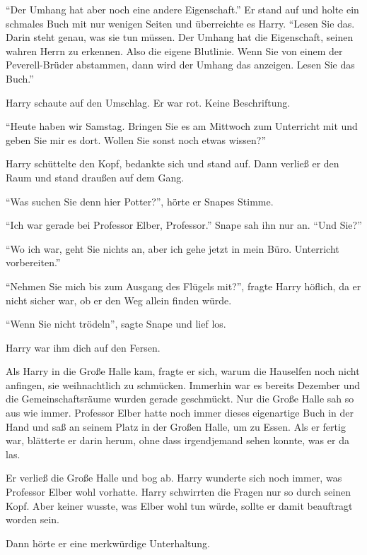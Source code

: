 \enquote{Der Umhang hat aber noch eine andere Eigenschaft.} Er stand auf und holte ein schmales Buch mit nur wenigen Seiten und überreichte es Harry. \enquote{Lesen Sie das. Darin steht genau, was sie tun müssen. Der Umhang hat die Eigenschaft, seinen wahren Herrn zu erkennen. Also die eigene Blutlinie. Wenn Sie von einem der Peverell-Brüder abstammen, dann wird der Umhang das anzeigen. Lesen Sie das Buch.}

Harry schaute auf den Umschlag. Er war rot. Keine Beschriftung.

\enquote{Heute haben wir Samstag. Bringen Sie es am Mittwoch zum Unterricht mit und geben Sie mir es dort. \gst Wollen Sie sonst noch etwas wissen?}

Harry schüttelte den Kopf, bedankte sich und stand auf. Dann verließ er den Raum und stand draußen auf dem Gang.

\enquote{Was suchen Sie denn hier Potter?}, hörte er Snapes Stimme.

\enquote{Ich war gerade bei Professor Elber, Professor.} Snape sah ihn nur an. \enquote{Und Sie?}

\enquote{Wo ich war, geht Sie nichts an, aber ich gehe jetzt in mein Büro. Unterricht vorbereiten.}

\enquote{Nehmen Sie mich bis zum Ausgang des Flügels mit?}, fragte Harry höflich, da er nicht sicher war, ob er den Weg allein finden würde.

\enquote{Wenn Sie nicht trödeln}, sagte Snape und lief los.

Harry war ihm dich auf den Fersen.

\trenn

Als Harry in die Große Halle kam, fragte er sich, warum die Hauselfen noch nicht anfingen, sie weihnachtlich zu schmücken. Immerhin war es bereits Dezember und die Gemeinschaftsräume wurden gerade geschmückt. Nur die Große Halle sah so aus wie immer. Professor Elber hatte noch immer dieses eigenartige Buch in der Hand und saß an seinem Platz in der Großen Halle, um zu Essen. Als er fertig war, blätterte er darin herum, ohne dass irgendjemand sehen konnte, was er da las.

Er verließ die Große Halle und bog ab. Harry wunderte sich noch immer, was Professor Elber wohl vorhatte.  Harry schwirrten die Fragen nur so durch seinen Kopf. Aber keiner wusste, was Elber wohl tun würde, sollte er damit beauftragt worden sein.

Dann hörte er eine merkwürdige Unterhaltung.

